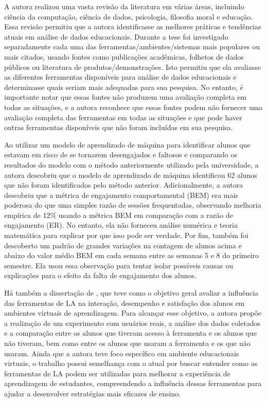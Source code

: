 A autora realizou uma vasta revisão da literatura em várias áreas, incluindo ciência da computação, ciência de dados, psicologia, filosofia moral e educação. Essa revisão permitiu que a autora identificasse as melhores práticas e tendências atuais em análise de dados educacionais. Durante a tese foi investigado separadamente cada uma das ferramentas/ambientes/sistemas mais populares ou mais citados, usando fontes como publicações acadêmicas, folhetos de dados públicos ou literatura de produtos/demonstrações. Isto permitiu que ela avaliasse as diferentes ferramentas disponíveis para análise de dados educacionais e determinasse quais seriam mais adequadas para sua pesquisa. No entanto, é importante notar que essas fontes não produzem uma avaliação completa em todas as situações, e a autora reconhece que essas fontes podem não fornecer uma avaliação completa das ferramentas em todas as situações e que pode haver outras ferramentas disponíveis que não foram incluídas em sua pesquisa.

Ao utilizar um modelo de aprendizado de máquina para identificar alunos que estavam em risco de se tornarem desengajados e faltosos e comparando os resultados do modelo com o método anteriormente utilizado pela universidade, a autora descobriu que o modelo de aprendizado de máquina identificou 62 alunos que não foram identificados pelo método anterior. Adicionalmente, a autora descobriu que a métrica de engajamento comportamental (BEM) era mais poderosa do que uma simples razão de sessões frequentadas, observando melhoria empírica de 12\% usando a métrica BEM em comparação com a razão de engajamento (ER). No entanto, ela não forneceu análise numérica e teoria matemática para explicar por que isso pode ser verdade. Por fim, também foi descoberto um padrão de grandes variações na contagem de alunos acima e abaixo do valor médio BEM em cada semana entre as semanas 5 e 8 do primeiro semestre. Ela usou essa observação para tentar isolar possíveis causas ou explicações para o efeito da falta de engajamento dos alunos.


Há também a dissertação de , que teve como o objetivo geral avaliar a influência das ferramentas de LA na interação, desempenho e satisfação dos alunos em ambientes virtuais de aprendizagem. Para alcançar esse objetivo, a autora propõe a realização de um experimento com usuários reais, a análise dos dados coletados e a comparação entre os alunos que tiveram acesso à ferramenta e os alunos que não tiveram, bem como entre os alunos que usaram a ferramenta e os que não usaram. Ainda que a autora teve foco específico em ambiente educacionais virtuais, o trabalho possui semelhança com o atual por buscar entender como as ferramentas de LA podem ser utilizadas para melhorar a experiência de aprendizagem de estudantes, compreendendo a influência dessas ferramentas para ajudar a desenvolver estratégias mais eficazes de ensino.

